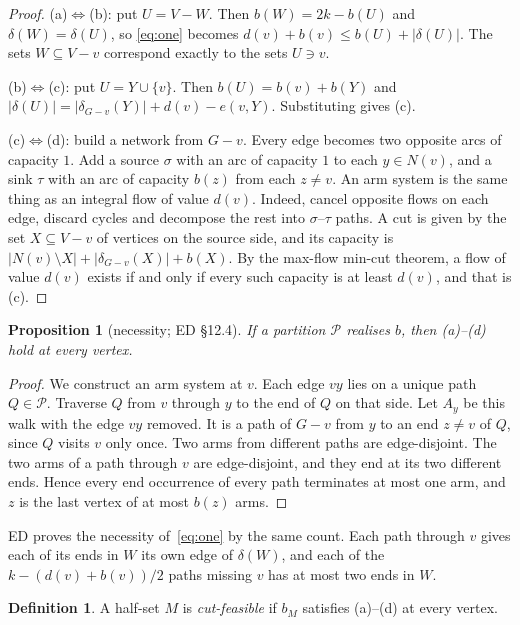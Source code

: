\documentclass[11pt]{amsart}
\newtheorem{proposition}[theorem]{Proposition}
\theoremstyle{definition}
\newtheorem{definition}[theorem]{Definition}
\newcommand{\cP}{\mathcal P}
\begin{document}
\begin{proof}
(a)$\Leftrightarrow$(b): put $U=V-W$. Then $b(W)=2k-b(U)$ and $\delta(W)=\delta(U)$, so
\eqref{eq:one} becomes $d(v)+b(v)\le b(U)+|\delta(U)|$. The sets $W\subseteq V-v$ correspond exactly
to the sets $U\ni v$.

(b)$\Leftrightarrow$(c): put $U=Y\cup\{v\}$. Then $b(U)=b(v)+b(Y)$ and
$|\delta(U)|=|\delta_{G-v}(Y)|+d(v)-e(v,Y)$. Substituting gives (c).

(c)$\Leftrightarrow$(d): build a network from $G-v$. Every edge becomes two opposite arcs of
capacity $1$. Add a source $\sigma$ with an arc of capacity $1$ to each $y\in N(v)$, and a sink $\tau$
with an arc of capacity $b(z)$ from each $z\ne v$. An arm system is the same thing as an integral flow
of value $d(v)$. Indeed, cancel opposite flows on each edge, discard cycles and decompose the rest
into $\sigma$--$\tau$ paths. A cut is given by the set $X\subseteq V-v$ of vertices on the source
side, and its capacity is $|N(v)\setminus X|+|\delta_{G-v}(X)|+b(X)$. By the max-flow min-cut
theorem, a flow of value $d(v)$ exists if and only if every such capacity is at least $d(v)$, and that
is (c).
\end{proof}

\begin{proposition}[necessity; ED \S12.4]\label{prop:nec}
If a partition $\cP$ realises $b$, then (a)--(d) hold at every vertex.
\end{proposition}

\begin{proof}
We construct an arm system at $v$. Each edge $vy$ lies on a unique path $Q\in\cP$. Traverse $Q$ from
$v$ through $y$ to the end of $Q$ on that side. Let $A_y$ be this walk with the edge $vy$ removed. It
is a path of $G-v$ from $y$ to an end $z\neq v$ of $Q$, since $Q$ visits $v$ only once. Two arms
from different paths are edge-disjoint. The two arms of a path through $v$ are edge-disjoint, and they
end at its two different ends. Hence every end occurrence of every path terminates at most one arm,
and $z$ is the last vertex of at most $b(z)$ arms.
\end{proof}

ED proves the necessity of~\eqref{eq:one} by the same count. Each path through $v$ gives each of its
ends in $W$ its own edge of $\delta(W)$, and each of the $k-(d(v)+b(v))/2$ paths missing $v$ has at
most two ends in $W$.

\begin{definition}
A half-set $M$ is \emph{cut-feasible} if $b_M$ satisfies (a)--(d) at every vertex.
\end{definition}
\end{document}
